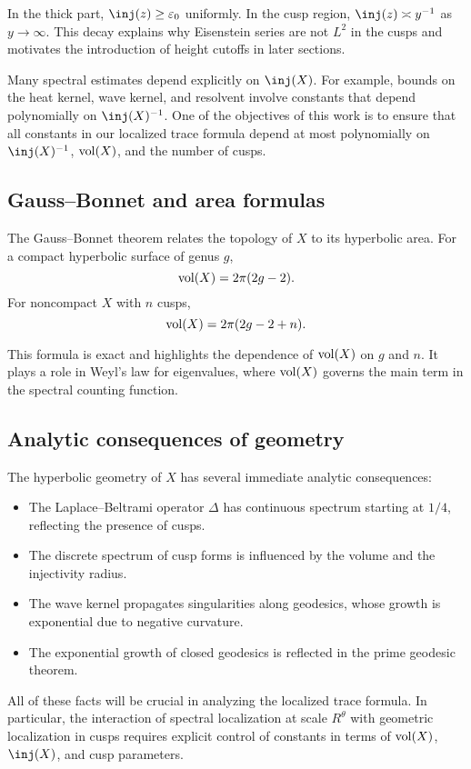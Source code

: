 In the thick part, $\inj(z) \ge \varepsilon_0$ uniformly. 
In the cusp region, $\inj(z) \asymp y^{-1}$ as $y \to \infty$. 
This decay explains why Eisenstein series are not $L^2$ in the cusps and motivates the introduction of height cutoffs in later sections.

Many spectral estimates depend explicitly on $\inj(X)$. 
For example, bounds on the heat kernel, wave kernel, and resolvent involve constants that depend polynomially on $\inj(X)^{-1}$. 
One of the objectives of this work is to ensure that all constants in our localized trace formula depend at most polynomially on $\inj(X)^{-1}$, $\operatorname{vol}(X)$, and the number of cusps.

\subsection{Gauss--Bonnet and area formulas}\label{subsec:gaussbonnet}

The Gauss--Bonnet theorem relates the topology of $X$ to its hyperbolic area. 
For a compact hyperbolic surface of genus $g$,
\[
\operatorname{vol}(X) = 2\pi (2g-2).
\]
For noncompact $X$ with $n$ cusps,
\[
\operatorname{vol}(X) = 2\pi(2g - 2 + n).
\]

This formula is exact and highlights the dependence of $\operatorname{vol}(X)$ on $g$ and $n$. 
It plays a role in Weyl's law for eigenvalues, where $\operatorname{vol}(X)$ governs the main term in the spectral counting function.

\subsection{Analytic consequences of geometry}\label{subsec:geometry-analytic}

The hyperbolic geometry of $X$ has several immediate analytic consequences:
\begin{itemize}
  \item The Laplace--Beltrami operator $\Delta$ has continuous spectrum starting at $1/4$, reflecting the presence of cusps.
  \item The discrete spectrum of cusp forms is influenced by the volume and the injectivity radius.
  \item The wave kernel propagates singularities along geodesics, whose growth is exponential due to negative curvature.
  \item The exponential growth of closed geodesics is reflected in the prime geodesic theorem.
\end{itemize}

All of these facts will be crucial in analyzing the localized trace formula. 
In particular, the interaction of spectral localization at scale $R^\theta$ with geometric localization in cusps 
requires explicit control of constants in terms of $\operatorname{vol}(X)$, $\inj(X)$, and cusp parameters.

